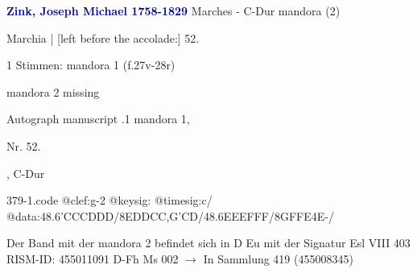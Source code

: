 \documentclass[twocolumn]{book}
\begin{document}
\newline \par \vspace{7pt} \textcolor{darkblue}{\textbf{Zink, Joseph Michael  1758-1829}}
\newline Marches - C-Dur
\newline mandora (2)
\newline \begin{itshape}[f.27v, at left:] Marchia | [left before the accolade:] 52.\end{itshape} 
\newline \textcolor{darkblue}{}  1 Stimmen: mandora 1  (f.27v-28r)
\newline \begin{small} mandora 2 missing\end{small} 
\newline Autograph manuscript
.1  mandora 1, \begin{itshape}Nr. 52.\end{itshape}, C-Dur  
\begin{filecontents*}{379-1.code}
@clef:g-2
@keysig:
@timesig:c/
@data:48.6'C{CC}D{DD}/{8EDDC}{C,G'CD}/48.6E{EE}F{FF}/{8GFFE}4E-/
\end{filecontents*}
\newline
%
\newline Der Band mit der mandora 2 befindet sich in D Eu mit der Signatur Esl VIII 403
\newline RISM-ID: 455011091
\newline D-Fh  Ms 002
\newline $\rightarrow$ In Sammlung 419 (455008345)
      
\end{document}

